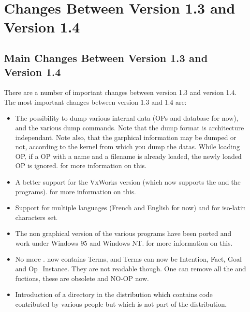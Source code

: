 \section{Changes Between Version 1.3 and Version 1.4}



\subsection{Main Changes Between Version 1.3 and Version 1.4}

There are a number of important changes between version 1.3 and version 1.4.
The most important changes between version 1.3 and 1.4 are:

\begin{itemize}

\item The possibility to dump various internal data (OPs and database for now),
and the various dump commands. Note that the dump format is architecture
independant. Note also, that the garphical information may be dumped or not,
according to the kernel from which you dump the datas. While loading OP, if a
OP with a name and a filename is already loaded, the newly loaded OP is
ignored.  for more information on
this. 

\item A better support for the VxWorks version (which now supports the \MPA{}
and the  programs).  for more information on
this. 

\item Support for multiple languages (French and English for now) and for
iso-latin characters set.

\item The non graphical version of the various \COPRSDE{} programs have been
ported and work under Windows 95 and Windows NT.  for more
information on this.

\item No more .  now contains Terms, and Terms
can now be Intention, Fact, Goal and Op\_Instance. They are not readable
though. One can remove all the  and 
fuctions, these are obsolete and NO-OP now.

\item Introduction of a  directory in the distribution which
contains code contributed by various people but which is not part of the \OPRS{}
distribution. 

\end{itemize}

